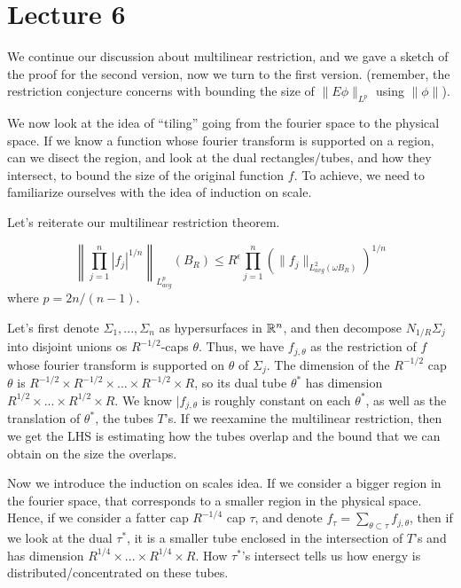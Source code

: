 \section*{Lecture 6}
We continue our discussion about multilinear restriction, and we gave a sketch of the proof for the second version, now we turn to the first version. (remember, the restriction conjecture concerns with bounding the size of $\|E\phi\|_{L^p}$ using $\|\phi\|$).

We now look at the idea of ``tiling'' going from the fourier space to the physical space. If we know a function whose fourier transform is supported on a region, can we disect the region, and look at the dual rectangles/tubes, and how they intersect, to bound the size of the original function $f$. To achieve, we need to familiarize ourselves with the idea of induction on scale.

Let's reiterate our multilinear restriction theorem.
\begin{theorem}
\begin{equation*}
    \left\|\prod_{j=1}^n |f_j|^{1/n} \right\|_{L_{avg}^p}(B_R)\leq R^\epsilon\prod_{j=1}^n\left(\|f_j\|_{L_{avg}^2(\omega B_R)} \right)^{1/n}
\end{equation*}
where $p=2n/(n-1)$.
\end{theorem}
Let's first denote $\Sigma_1, ..., \Sigma_n$ as hypersurfaces in $\mathbb{R}^n$, and then decompose $N_{1/R}\Sigma_j$ into disjoint unions os $R^{-1/2}$-caps $\theta$. Thus, we have $f_{j,\theta}$ as the restriction of $f$ whose fourier transform is supported on $\theta$ of $\Sigma_j$. The dimension of the $R^{-1/2}$ cap  $\theta$ is $R^{-1/2}\times R^{-1/2}\times...\times R^{-1/2}\times R$, so its dual tube $\theta^*$ has dimension $R^{1/2}\times...\times R^{1/2}\times R$. We know $|f_{j,\theta}$ is roughly constant on each $\theta^*$, as well as the translation of $\theta^*$, the tubes $T$'s. If we reexamine the multilinear restriction, then we get the LHS is estimating how the tubes overlap and the bound that we can obtain on the size the overlaps.

Now we introduce the induction on scales idea. If we consider a bigger region in the fourier space, that corresponds to a smaller region in the physical space. Hence, if we consider a fatter cap $R^{-1/4}$ cap $\tau$, and denote $f_\tau=\sum_{\theta\subset\tau}f_{j,\theta}$, then if we look at the dual $\tau^*$, it is a smaller tube enclosed in the intersection of $T$'s and has dimension $R^{1/4}\times...\times R^{1/4}\times R$. How $\tau^*$'s intersect tells us how energy is distributed/concentrated on these tubes.

